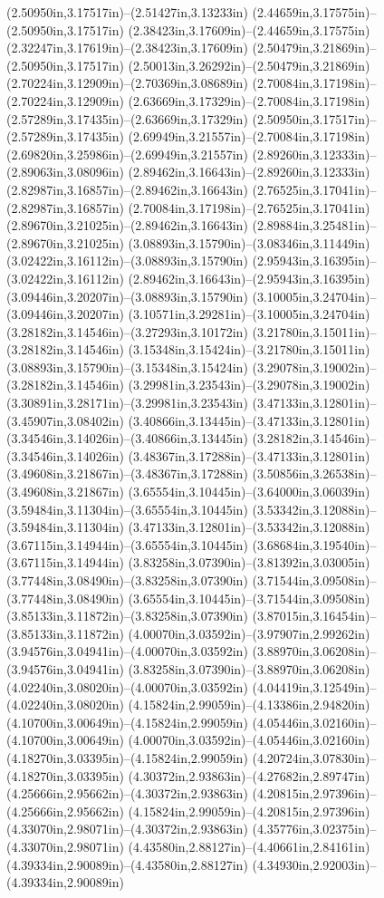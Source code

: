 (2.50950in,3.17517in)--(2.51427in,3.13233in) (2.44659in,3.17575in)--(2.50950in,3.17517in) (2.38423in,3.17609in)--(2.44659in,3.17575in) (2.32247in,3.17619in)--(2.38423in,3.17609in) (2.50479in,3.21869in)--(2.50950in,3.17517in) (2.50013in,3.26292in)--(2.50479in,3.21869in) (2.70224in,3.12909in)--(2.70369in,3.08689in) (2.70084in,3.17198in)--(2.70224in,3.12909in) (2.63669in,3.17329in)--(2.70084in,3.17198in) (2.57289in,3.17435in)--(2.63669in,3.17329in) (2.50950in,3.17517in)--(2.57289in,3.17435in) (2.69949in,3.21557in)--(2.70084in,3.17198in) (2.69820in,3.25986in)--(2.69949in,3.21557in) (2.89260in,3.12333in)--(2.89063in,3.08096in) (2.89462in,3.16643in)--(2.89260in,3.12333in) (2.82987in,3.16857in)--(2.89462in,3.16643in) (2.76525in,3.17041in)--(2.82987in,3.16857in) (2.70084in,3.17198in)--(2.76525in,3.17041in) (2.89670in,3.21025in)--(2.89462in,3.16643in) (2.89884in,3.25481in)--(2.89670in,3.21025in) (3.08893in,3.15790in)--(3.08346in,3.11449in) (3.02422in,3.16112in)--(3.08893in,3.15790in) (2.95943in,3.16395in)--(3.02422in,3.16112in) (2.89462in,3.16643in)--(2.95943in,3.16395in) (3.09446in,3.20207in)--(3.08893in,3.15790in) (3.10005in,3.24704in)--(3.09446in,3.20207in) (3.10571in,3.29281in)--(3.10005in,3.24704in) (3.28182in,3.14546in)--(3.27293in,3.10172in) (3.21780in,3.15011in)--(3.28182in,3.14546in) (3.15348in,3.15424in)--(3.21780in,3.15011in) (3.08893in,3.15790in)--(3.15348in,3.15424in) (3.29078in,3.19002in)--(3.28182in,3.14546in) (3.29981in,3.23543in)--(3.29078in,3.19002in) (3.30891in,3.28171in)--(3.29981in,3.23543in) (3.47133in,3.12801in)--(3.45907in,3.08402in) (3.40866in,3.13445in)--(3.47133in,3.12801in) (3.34546in,3.14026in)--(3.40866in,3.13445in) (3.28182in,3.14546in)--(3.34546in,3.14026in) (3.48367in,3.17288in)--(3.47133in,3.12801in) (3.49608in,3.21867in)--(3.48367in,3.17288in) (3.50856in,3.26538in)--(3.49608in,3.21867in) (3.65554in,3.10445in)--(3.64000in,3.06039in) (3.59484in,3.11304in)--(3.65554in,3.10445in) (3.53342in,3.12088in)--(3.59484in,3.11304in) (3.47133in,3.12801in)--(3.53342in,3.12088in) (3.67115in,3.14944in)--(3.65554in,3.10445in) (3.68684in,3.19540in)--(3.67115in,3.14944in) (3.83258in,3.07390in)--(3.81392in,3.03005in) (3.77448in,3.08490in)--(3.83258in,3.07390in) (3.71544in,3.09508in)--(3.77448in,3.08490in) (3.65554in,3.10445in)--(3.71544in,3.09508in) (3.85133in,3.11872in)--(3.83258in,3.07390in) (3.87015in,3.16454in)--(3.85133in,3.11872in) (4.00070in,3.03592in)--(3.97907in,2.99262in) (3.94576in,3.04941in)--(4.00070in,3.03592in) (3.88970in,3.06208in)--(3.94576in,3.04941in) (3.83258in,3.07390in)--(3.88970in,3.06208in) (4.02240in,3.08020in)--(4.00070in,3.03592in) (4.04419in,3.12549in)--(4.02240in,3.08020in) (4.15824in,2.99059in)--(4.13386in,2.94820in) (4.10700in,3.00649in)--(4.15824in,2.99059in) (4.05446in,3.02160in)--(4.10700in,3.00649in) (4.00070in,3.03592in)--(4.05446in,3.02160in) (4.18270in,3.03395in)--(4.15824in,2.99059in) (4.20724in,3.07830in)--(4.18270in,3.03395in) (4.30372in,2.93863in)--(4.27682in,2.89747in) (4.25666in,2.95662in)--(4.30372in,2.93863in) (4.20815in,2.97396in)--(4.25666in,2.95662in) (4.15824in,2.99059in)--(4.20815in,2.97396in) (4.33070in,2.98071in)--(4.30372in,2.93863in) (4.35776in,3.02375in)--(4.33070in,2.98071in) (4.43580in,2.88127in)--(4.40661in,2.84161in) (4.39334in,2.90089in)--(4.43580in,2.88127in) (4.34930in,2.92003in)--(4.39334in,2.90089in) 